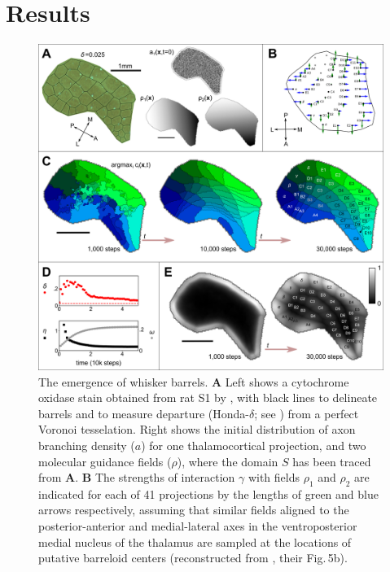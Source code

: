 \documentclass[9pt,lineno]{elife}
\newcommand{\cmnt}[1]{\textcolor{colcmnt}{#1}}
\newcommand{\MPone}[1]{\textcolor{colmpone}{#1}}
\begin{document}
\section{Results}

\begin{figure}
  \begin{fullwidth}
    \includegraphics[width=\linewidth]{./Fig1.png}
    \caption{The emergence of whisker barrels.
      \textbf{A} Left shows a cytochrome oxidase stain obtained from rat S1
      by \cite{zheng_signal_2001}, with black lines to delineate barrels and to
      measure departure (Honda-$\delta$; see \citealp{senft_mouse_1991}) from a
      perfect Voronoi tesselation. Right shows the initial distribution of axon
      branching density ($a$) for one thalamocortical projection, and two
      molecular guidance fields ($\rho$), \cmnt{where the domain $S$ has been
        traced from \textbf{A}}.
      \textbf{B} The strengths of interaction $\gamma$ with fields $\rho_1$
      and $\rho_2$ are indicated for each of 41 projections by the lengths of
      green and blue arrows respectively, assuming that similar fields aligned
      to the posterior-anterior and medial-lateral axes in the ventroposterior
      medial nucleus of the thalamus are sampled at the locations of putative
      barreloid centers (reconstructed from \citealp{haidarliu_size_2001},
      their \MPone{Fig.\,5b}).
}
\end{fullwidth}
\end{figure}
\end{document}
